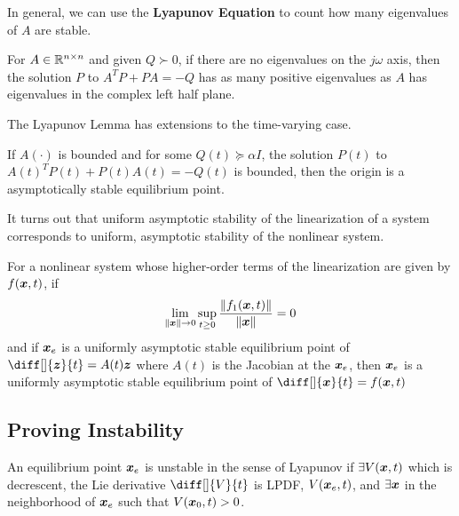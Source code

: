 In general, we can use the \textbf{Lyapunov Equation} to count how many
eigenvalues of $A$ are stable.
\begin{theorem}
	For $A\in\mathbb{R}^{n\times n}$ and given $Q \succ 0$, if there are no eigenvalues on
	the $j\omega$ axis, then the solution $P$ to $A^TP + PA = -Q$ has as many
	positive eigenvalues as $A$ has eigenvalues in the complex left half plane.
	\label{thm:tausskey-lemma}
\end{theorem}
The Lyapunov Lemma has extensions to the time-varying case.
\begin{theorem}
	If $A(\cdot)$ is bounded and for some $Q(t) \succeq \alpha I$, the solution
	$P(t)$ to $A(t)^TP(t) + P(t)A(t) = -Q(t)$ is bounded, then the origin is a
	asymptotically stable equilibrium point.
	\label{thm:tv-lyapuynov-lemma}
\end{theorem}
It turns out that uniform asymptotic stability of the linearization of a system
corresponds to uniform, asymptotic stability of the nonlinear system.
\begin{theorem}
	For a nonlinear system whose higher-order terms of the linearization are given
	by $f(\boldsymbol{x},t)$, if \[
		\lim_{\|\boldsymbol{x}\|\to 0}\sup_{t\geq 0} \frac{\|f_1(\boldsymbol{x},t)\|}{\|\boldsymbol{x}\|} =
		0
	\]
	and if $\boldsymbol{x}_e$ is a uniformly asymptotic stable equilibrium point of
	$\diff[]{\bs{z}}{t}=A(t)\bs{z}$ where $A(t)$ is the Jacobian at the $\boldsymbol{x}_e$,
	then $\boldsymbol{x}_e$ is a uniformly asymptotic stable
	equilibrium point of $\diff[]{\bs{x}}{t} = f(\bs{x},t)$
	\label{thm:indirect-lyapunov}
\end{theorem}
\subsection{Proving Instability}
\begin{theorem}
	An equilibrium point $\boldsymbol{x}_e$ is unstable in the sense of Lyapunov if
	$\exists V(\boldsymbol{x},t)$ which is decrescent, the Lie derivative $\diff[]{V}{t}$ is
	LPDF, $V(\boldsymbol{x}_e, t)$, and $\exists \boldsymbol{x}$ in the neighborhood of $\boldsymbol{x}_e$
	such that $V(\boldsymbol{x}_0, t) > 0$.
	\label{thm:lyapunov-instability}
\end{theorem}
